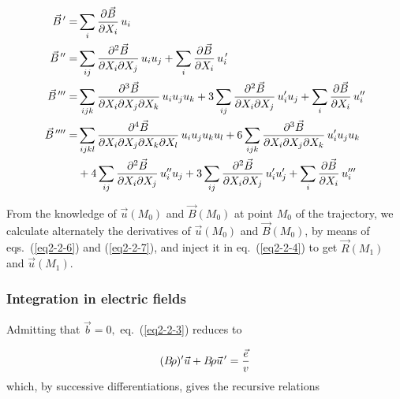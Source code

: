  \begin{equation}
	 \begin{aligned}
		 \vec  B^{\,\prime} =
		        &   \sum_i  \dfrac{\partial\vec  B}{\partial X_i}\, u_i \\
		 \vec  B^{\,\prime\prime} =
		        &  \sum_{ij}\dfrac{\partial^2\vec  B}{\partial X_i\partial X_j} 
		        \, u_i u_j+ \sum_i \dfrac{\partial\vec  B}{\partial X_i} \,u^{\,\prime}_i\\
		\vec  B^{\,\prime\prime\prime}  =
		        &  \sum_{ijk} \dfrac{\partial^3\vec  B}{\partial X_i\partial X_j\partial X_k}
		           \, u_i u_j u_k 
		           + 3 \sum_{ij} \dfrac{\partial^ 2\vec  B}{\partial X_i\partial X_j} \,u^{\prime}_i
		           u_j 
		           + \sum_i\frac{\partial\vec  B}{\partial X_i} \, u^{\prime\prime}_i \\
		\vec B^{\,\prime\prime\prime\prime}  = 
		        & \sum_{ijkl} \dfrac{\partial^ 4\vec  B}{\partial X_i\partial X_j\partial
		           X_k\partial X_l} \,u_i u_j u_k u_l 
		           + 6 \sum_{ijk}  \dfrac{\partial^ 3\vec  B}{\partial X_i\partial X_j\partial X_k} \,
		           u^{\prime}_i u_j u_k \\
		        &
		        +  4 \sum_{ij} \dfrac{\partial^ 2\vec  B}{\partial X_i\partial X_j}\,
		         u^{\prime\prime}_i u_j
		         + 3 \sum_{ij} \dfrac{\partial^ 2\vec  B}{\partial X_i\partial X_j}\,
		         u^{\prime}_i u^{\prime}_j 
		         + \sum_i \dfrac{\partial\vec  B}{\partial X_i}\, u^{\prime\prime \prime}_i 
	 \end{aligned}
 	\label{eq2-2-7}
 \end{equation} 
 
 \noindent From the knowledge of $ \vec  u(M_0) $ and $ \vec  B(M_0) $ at point
$ M_0 $ of the 
trajectory, we calculate alternately the derivatives of $ \vec  u(M_0) $ and 
$ \vec  B(M_0) $, by means of eqs.~(\ref{eq2-2-6}) and (\ref{eq2-2-7}), and inject it in 
eq.~(\ref{eq2-2-4}) to get 
$ \vec  R(M_1) $ and $ \vec  u(M_1) $.

\subsubsection[Integration in electric fields]%
       {Integration in electric fields~\protect\cite{Biblio6}}
        \label{sec2.2.2} %

Admitting that $ \vec  b=0, $ eq.~(\ref{eq2-2-3}) reduces to 

\begin{equation}
	(B\!\rho )^\prime\vec  u + B\!\rho\vec  u^{\,\prime} = \dfrac{\vec  e}{ v}
	\label{eq2-2-8}
\end{equation} 
%
which, by successive differentiations, gives the recursive relations

